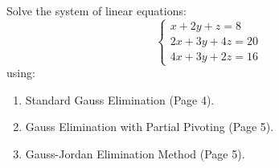 \documentclass[11pt,a4paper]{article}
\begin{document}
\begin{exambox}
Solve the system of linear equations:
\begin{equation}
    \begin{cases}
        x + 2y + z = 8 \\
        2x + 3y + 4z = 20 \\
        4x + 3y + 2z = 16
    \end{cases}
\end{equation}
using:
\begin{enumerate}
    \item Standard Gauss Elimination (Page 4).
    \item Gauss Elimination with Partial Pivoting (Page 5).
    \item Gauss-Jordan Elimination Method (Page 5).
\end{enumerate}
\end{exambox}
\end{document}
